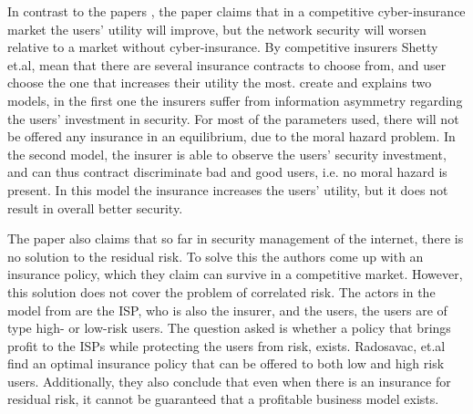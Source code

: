 In contrast to the papers \cite{bolot2008cyber, bolot2008new}, the paper \cite{shetty2010competitive} claims that in a competitive cyber-insurance market the users' utility will improve, but the network security will worsen relative to a market without cyber-insurance. By competitive insurers Shetty et.al, mean that there are several insurance contracts to choose from, and user choose the one that increases their utility the most.
\cite{shetty2010competitive} create and explains two models, in the first one the insurers suffer from information asymmetry regarding the users' investment in security. For most of the parameters used, there will not be offered any insurance in an equilibrium, due to the moral hazard problem. In the second model, the insurer is able to observe the users' security investment, and can thus contract discriminate bad and good users, i.e. no moral hazard is present. In this model the insurance increases the users' utility, but it does not result in overall better security.  

The paper \cite{radosavac2008using} also claims that so far in security management of the internet, there is no solution to the residual risk. To solve this the authors come up with an insurance policy, which they claim can survive in a competitive market. However, this solution does not cover the problem of correlated risk.
The actors in the model from \cite{radosavac2008using} are the ISP, who is also the insurer, and the users, the users are of type high- or low-risk users. The question asked is whether a policy that brings profit to the ISPs while protecting the users from risk, exists. Radosavac, et.al find an optimal insurance policy that can be offered to both low and high risk users. Additionally, they also conclude that even when there is an insurance for residual risk, it cannot be guaranteed that a profitable business model exists. 

